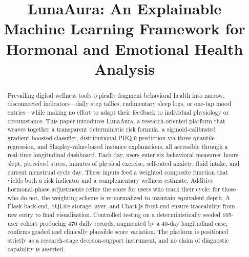 \documentclass[conference]{IEEEtran}
\begin{document}
\title{LunaAura: An Explainable Machine Learning Framework for Hormonal and Emotional Health Analysis}

\author{
\and
{}
}

\maketitle

\begin{abstract}
Prevailing digital wellness tools typically fragment behavioral health into narrow, disconnected indicators---daily step tallies, rudimentary sleep logs, or one-tap mood entries---while making no effort to adapt their feedback to individual physiology or circumstance. This paper introduces LunaAura, a research-oriented platform that weaves together a transparent deterministic risk formula, a sigmoid-calibrated gradient-boosted classifier, distributional PHQ-9 prediction via three-quantile regression, and Shapley-value-based instance explanations, all accessible through a real-time longitudinal dashboard. Each day, users enter six behavioral measures: hours slept, perceived stress, minutes of physical exercise, self-rated anxiety, fluid intake, and current menstrual cycle day. These inputs feed a weighted composite function that yields both a risk indicator and a complementary wellness estimate. Additive hormonal-phase adjustments refine the score for users who track their cycle; for those who do not, the weighting scheme is re-normalized to maintain equivalent depth. A Flask back-end, SQLite storage layer, and Chart.js front-end ensure traceability from raw entry to final visualization. Controlled testing on a deterministically seeded 105-user cohort producing 470 daily records, augmented by a 40-day longitudinal case, confirms graded and clinically plausible score variation. The platform is positioned strictly as a research-stage decision-support instrument, and no claim of diagnostic capability is asserted.
\end{abstract}
\end{document}
